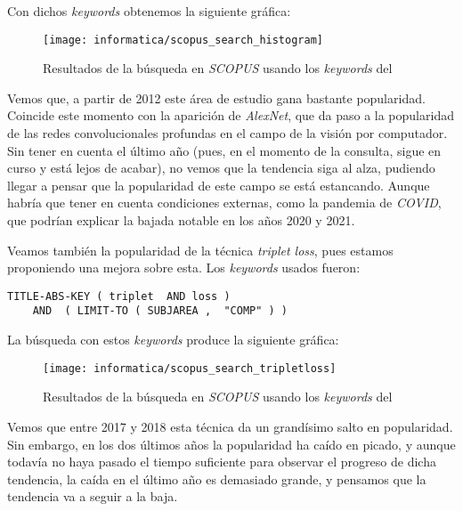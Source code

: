 Con dichos \textit{keywords} obtenemos la siguiente gráfica:

\begin{figure}[H]
    \centering
    \texttt{[image: informatica/scopus\_search\_histogram]}
    \caption{Resultados de la búsqueda en \textit{SCOPUS} usando los \textit{keywords} del }
\end{figure}

Vemos que, a partir de 2012 este área de estudio gana bastante popularidad. Coincide este momento con la aparición de \textit{AlexNet}, que da paso a la popularidad de las redes convolucionales profundas en el campo de la visión por computador. Sin tener en cuenta el último año (pues, en el momento de la consulta, sigue en curso y está lejos de acabar), no vemos que la tendencia siga al alza, pudiendo llegar a pensar que la popularidad de este campo se está estancando. Aunque habría que tener en cuenta condiciones externas, como la pandemia de \textit{COVID}, que podrían explicar la bajada notable en los años 2020 y 2021.

Veamos también la popularidad de la técnica \textit{triplet loss}, pues estamos proponiendo una mejora sobre esta. Los \textit{keywords} usados fueron:

\begin{lstlisting}[caption=\textit{Keywords usados para la búsqueda en \textit{SCOPUS} para consultar la popularidad del \textit{triplet loss}. Búsqueda realizada el 17 de Septiembre de 2023}, label=code:scopus_search_tripletloss, captionpos=b]
    TITLE-ABS-KEY ( triplet  AND loss )
    AND  ( LIMIT-TO ( SUBJAREA ,  "COMP" ) )
\end{lstlisting}

La búsqueda con estos \textit{keywords} produce la siguiente gráfica:

\begin{figure}[H]
    \centering
    \texttt{[image: informatica/scopus\_search\_tripletloss]}
    \caption{Resultados de la búsqueda en \textit{SCOPUS} usando los \textit{keywords} del  }
\end{figure}

Vemos que entre 2017 y 2018 esta técnica da un grandísimo salto en popularidad. Sin embargo, en los dos últimos años la popularidad ha caído en picado, y aunque todavía no haya pasado el tiempo suficiente para observar el progreso de dicha tendencia, la caída en el último año es demasiado grande, y pensamos que la tendencia va a seguir a la baja.

